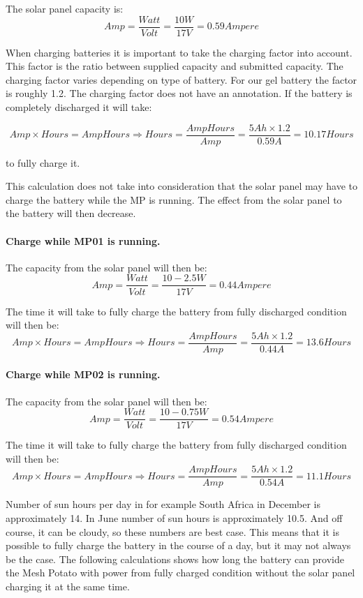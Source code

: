 The solar panel capacity is:
$$Amp = \frac{Watt}{Volt} = \frac{10 W}{17 V} = 0.59 Ampere$$

When charging batteries it is important to take the charging factor into account. This factor is the ratio between supplied capacity and submitted capacity. The charging factor varies depending on type of battery. For our gel battery the factor is roughly 1.2. The charging factor does not have an annotation. 
If the battery is completely discharged it will take: 

$$Amp\times Hours = AmpHours \Rightarrow Hours =\frac{AmpHours}{Amp} = \frac{5 Ah\times 1.2}{0.59 A} = 10.17 Hours$$

to fully charge it. 

This calculation does not take into consideration that the solar panel may have to charge the battery while the MP is running. The effect from the solar panel to the battery will then decrease. 

\paragraph{Charge while MP01 is running.}
The capacity from the solar panel will then be: 
$$Amp = \frac{Watt}{Volt} = \frac{10-2.5 W}{17 V} = 0.44 Ampere$$

The time it will take to fully charge the battery from fully discharged condition will then be: 
$$Amp\times Hours = AmpHours \Rightarrow Hours =\frac{AmpHours}{Amp} = \frac{5 Ah\times 1.2}{0.44A} = 13.6 Hours$$

\paragraph{Charge while MP02 is running.}
The capacity from the solar panel will then be: 
$$Amp = \frac{Watt}{Volt} = \frac{10-0.75 W}{17 V} = 0.54 Ampere$$

The time it will take to fully charge the battery from fully discharged condition will then be: 
$$Amp\times Hours = AmpHours \Rightarrow Hours =\frac{AmpHours}{Amp} = \frac{5 Ah\times 1.2}{0.54A} = 11.1 Hours$$

Number of sun hours per day in for example South Africa in December is approximately 14. In June number of sun hours is approximately 10.5. And off course, it can be cloudy, so these numbers are best case. This means that it is possible to fully charge the battery in the course of a day, but it may not always be the case. The following calculations shows how long the battery can provide the Mesh Potato with power from fully charged condition without the solar panel charging it at the same time. 

